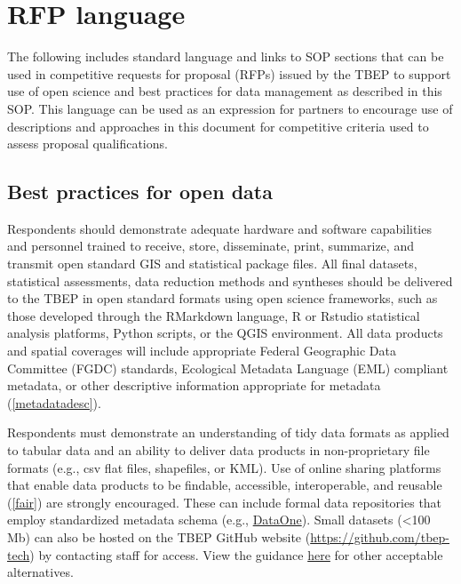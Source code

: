 \documentclass[
]{book}
\begin{document}
\hypertarget{rfp-language}{%
\section{RFP language}\label{rfp-language}}

The following includes standard language and links to SOP sections that can be used in competitive requests for proposal (RFPs) issued by the TBEP to support use of open science and best practices for data management as described in this SOP. This language can be used as an expression for partners to encourage use of descriptions and approaches in this document for competitive criteria used to assess proposal qualifications.

\hypertarget{best-practices-for-open-data}{%
\subsection{Best practices for open data}\label{best-practices-for-open-data}}

Respondents should demonstrate adequate hardware and software capabilities and personnel trained to receive, store, disseminate, print, summarize, and transmit open standard GIS and statistical package files. All final datasets, statistical assessments, data reduction methods and syntheses should be delivered to the TBEP in open standard formats using open science frameworks, such as those developed through the RMarkdown language, R or Rstudio statistical analysis platforms, Python scripts, or the QGIS environment. All data products and spatial coverages will include appropriate Federal Geographic Data Committee (FGDC) standards, Ecological Metadata Language (EML) compliant metadata, or other descriptive information appropriate for metadata (\ref{metadatadesc}).

Respondents must demonstrate an understanding of tidy data formats as applied to tabular data and an ability to deliver data products in non-proprietary file formats (e.g., csv flat files, shapefiles, or KML). Use of online sharing platforms that enable data products to be findable, accessible, interoperable, and reusable (\ref{fair}) are strongly encouraged. These can include formal data repositories that employ standardized metadata schema (e.g., \href{https://www.dataone.org/}{DataOne}). Small datasets (\textless100 Mb) can also be hosted on the TBEP GitHub website (\url{https://github.com/tbep-tech}) by contacting staff for access. View the guidance \href{https://tbep-tech.github.io/data-management-sop/keys.html\#datahome}{here} for other acceptable alternatives.
\end{document}
